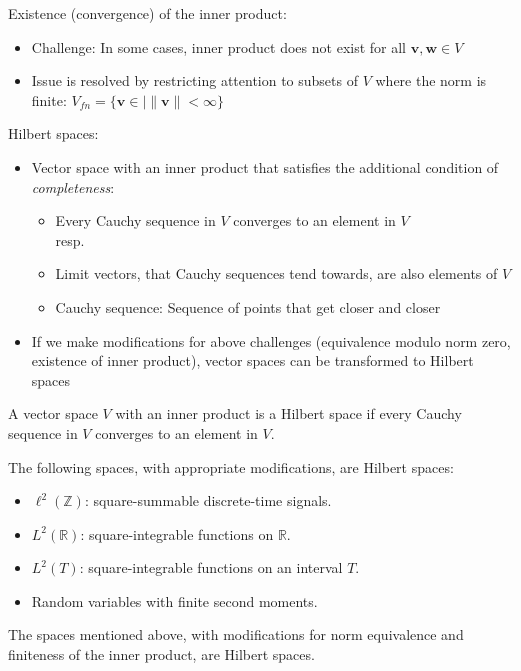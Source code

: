Existence (convergence) of the inner product:
\begin{itemize}
    \item Challenge: In some cases, inner product does not exist for all $\boldsymbol{v}, \boldsymbol{w} \in V$
    \item Issue is resolved by restricting attention to subsets of $V$ where the norm is finite: $V_{fn} = \{ \boldsymbol{v} \in | \| \boldsymbol{v} \| < \infty \}$
\end{itemize}

Hilbert spaces:
\begin{itemize}
    \item Vector space with an inner product that satisfies the additional condition of \emph{completeness}:
    \begin{itemize}
        \item Every Cauchy sequence in $V$ converges to an element in $V$\\
        resp.
        \item Limit vectors, that Cauchy sequences tend towards, are also elements of $V$
        \item Cauchy sequence: Sequence of points that get closer and closer
    \end{itemize}
    \item If we make modifications for above challenges (equivalence modulo norm zero, existence of inner product), vector spaces can be transformed to Hilbert spaces
\end{itemize}

\begin{definition}
    A vector space $V$ with an inner product is a Hilbert space if every Cauchy sequence in $V$ converges to an element in $V$.
\end{definition}
\begin{example}
    The following spaces, with appropriate modifications, are Hilbert spaces:
    \begin{itemize}
        \item $\ell^2(\mathbb{Z})$: square-summable discrete-time signals.
        \item $L^2(\mathbb{R})$: square-integrable functions on $\mathbb{R}$.
        \item $L^2(T)$: square-integrable functions on an interval $T$.
        \item Random variables with finite second moments.
    \end{itemize}
\end{example}
\begin{theorem}
    The spaces mentioned above, with modifications for norm equivalence and finiteness of the inner product, are Hilbert spaces.
\end{theorem}

